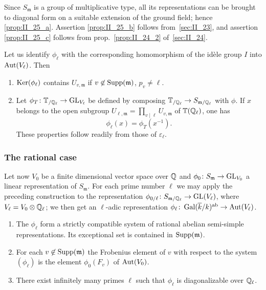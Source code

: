Since $S_\mathfrak{m}$ is a group of multiplicative type, all its 
representations can be brought to diagonal form on a suitable extension of the 
ground field; hence \ref{prop:II_25_a}. Assertion \ref{prop:II_25_b} follows
from~\ref{sec:II_23}, and assertion \ref{prop:II_25_c} follows from
prop.~\ref{prop:II_24_2} of~\ref{sec:II_24}.

\begin{obs}
Let us identify $\phi_\ell$ with the corresponding homomorphism of the idèle 
group $I$ into $\operatorname{Aut}(V_\ell)$. Then
\begin{enumerate}[resume*=prII_25_1]
\item $\operatorname{Ker}(\phi_\ell)$ contains $U_{v , \mathfrak{m}}$ if $v \not\in 
\operatorname{Supp}(\mathfrak{m})$, $p_v \neq \ell$.
\item Let $\phi_T \colon \mathbb{T}_{/\mathbb{Q}_\ell} \to \operatorname{GL}_{V_\ell}$ be defined by 
composing $\mathbb{T}_{/\mathbb{Q}_\ell} \to S_{\mathfrak{m}/\mathbb{Q}_\ell}$ with $\phi$. If $x$ 
belongs to the open subgroup $U_{\ell , \mathfrak{m}} = \prod_{v \mid \ell} 
U_{v , \mathfrak{m}}$ of $\mathbb{T}(\mathbb{Q}_\ell)$, one has
\[
	\phi_\ell (x) = \phi_T(x^{-1}).
\]
These properties follow readily from those of $\varepsilon_\ell$.
\end{enumerate}
\end{obs}

\subsubsection{The rational case}

Let now $V_0$ be a finite dimensional vector space over $\mathbb{Q}$ and 
$\phi_0 \colon S_\mathfrak{m} \to \operatorname{GL}_{V_0}$ a linear representation of 
$S_\mathfrak{m}$. For each prime number $\ell$ we may apply the preceding 
construction to the representation $\phi_{0/\ell} \colon S_{\mathfrak{m}/
\mathbb{Q}_{\ell}} \to \operatorname{GL}(V_\ell)$, where $V_\ell = V_0 \otimes \mathbb{Q}_\ell$; 
\dpage
we then get an $\ell$-adic representation $\phi_\ell \colon \operatorname{Gal}(\overline{k}/k)^{\mathrm{ab}} \to \operatorname{Aut} (V_\ell)$.

\begin{thm}
\begin{enumerate}[1)]
	\item The $\phi_\ell$ form a strictly compatible system of rational abelian 
	semi-simple representations. Its exceptional set is contained in $\operatorname{Supp}
	(\mathfrak{m})$.
	\item For each $v \not\in \operatorname{Supp}(\mathfrak{m})$ the Frobenius element of $v$ 
	with respect to the system $(\phi_\ell)$ is the element $\phi_0(F_v)$ 
	of $\operatorname{Aut}(V_0)$.
	\item There exist infinitely many primes $\ell$ such that $\phi_\ell$ is 
	diagonalizable over $\mathbb{Q}_\ell$.
\end{enumerate}
\end{thm}

